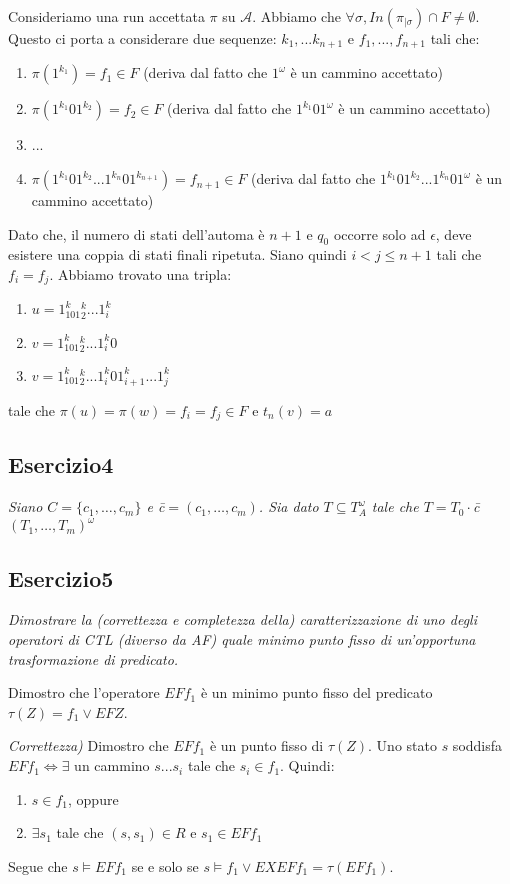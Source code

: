 \documentclass[12pt]{article}
\newcommand{\A}{\ensuremath{\mathcal{A}}\xspace}
\begin{document}
Consideriamo una run accettata $\pi$ su $\A$. Abbiamo che $\forall \sigma, In(\pi_{|\sigma}) \cap F \neq \emptyset$. Questo ci porta a considerare due sequenze: $k_1,...k_{n+1}$ e $f_1,...,f_{n+1}$ tali che:
\begin{enumerate}
\item $\pi(1^{k_1}) = f_1 \in F$ (deriva dal fatto che $1^\omega$ è un cammino accettato)
\item $\pi(1^{k_1}01^{k_2}) = f_2 \in F$ (deriva dal fatto che $1^{k_1}01^\omega$ è un cammino accettato)
\item ...
\item $\pi(1^{k_1}01^{k_2}...1^{k_n}01^{k_{n+1}}) = f_{n+1} \in F$ (deriva dal fatto che $1^{k_1}01^{k_2}...1^{k_n}01^\omega$ è un cammino accettato)
\end{enumerate}

Dato che, il numero di stati dell'automa è $n+1$ e $q_0$ occorre solo ad $\epsilon$, deve esistere una coppia di stati finali ripetuta. Siano quindi $i<j\leq n+1$ tali che $f_i=f_j$. Abbiamo trovato una tripla:
\begin{enumerate}
\item $u=1^k_101^k_2...1^k_i$
\item $v=1^k_101^k_2...1^k_i0$
\item $v=1^k_101^k_2...1^k_i01^k_{i+1}...1^k_j$
\end{enumerate} 
tale che $\pi(u)=\pi(w)=f_i=f_j \in F$ e $t_n(v)=a$ 

\subsection*{Esercizio4}
\textit{Siano $C=\{c_1,\ldots,c_m\}$ e \=c$= ( c_1,\ldots,c_m) $. Sia dato $T \subseteq T^{\omega}_A$ tale che $T=T_0 \cdot$\=c$(T_1,\ldots,T_m)^{\omega}$}


\subsection*{Esercizio5}
\textit{Dimostrare la (correttezza e completezza della) caratterizzazione di uno degli operatori di CTL (diverso da AF) quale minimo punto fisso di un’opportuna trasformazione di predicato.}

Dimostro che l'operatore $EF f_1$ è un minimo punto fisso del predicato $\tau(Z)=f_1 \lor EFZ$.

\medskip

\textit{Correttezza)} Dimostro che $EF f_1$ è un punto fisso di $\tau(Z)$.
Uno stato $s$ soddisfa $EF f_1 \Leftrightarrow \exists $ un cammino $s...s_i$ tale che $s_i \in f_1$. Quindi:
\begin{enumerate}[noitemsep]
\item $s \in f_1$, oppure
\item $\exists s_1$ tale che $(s,s_1) \in R$ e $s_1 \in EF f_1$
\end{enumerate}
Segue che $s \models EF f_1$ se e solo se $s \models f_1 \lor EXEF f_1 = \tau(EF f_1)$.
\end{document}
